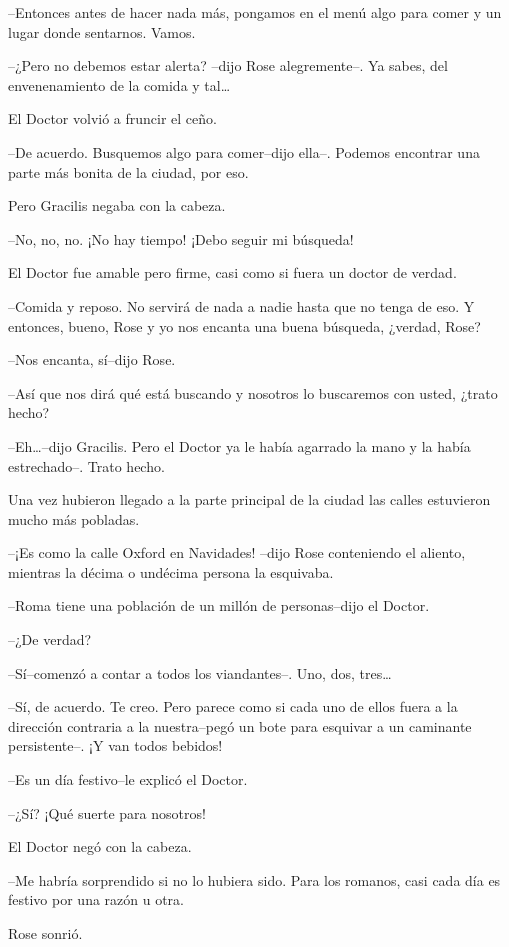 --Entonces antes de hacer nada más, pongamos en el menú algo para comer
y un lugar donde sentarnos. Vamos.

--¿Pero no debemos estar alerta? --dijo Rose alegremente--. Ya sabes,
del envenenamiento de la comida y tal\ldots{}

El Doctor volvió a fruncir el ceño.

--De acuerdo. Busquemos algo para comer--dijo ella--. Podemos encontrar
una parte más bonita de la ciudad, por eso.

Pero Gracilis negaba con la cabeza.

--No, no, no. ¡No hay tiempo! ¡Debo seguir mi búsqueda!

El Doctor fue amable pero firme, casi como si fuera un doctor de verdad.

--Comida y reposo. No servirá de nada a nadie hasta que no tenga de eso.
Y entonces, bueno, Rose y yo nos encanta una buena búsqueda, ¿verdad,
Rose?

--Nos encanta, sí--dijo Rose.

--Así que nos dirá qué está buscando y nosotros lo buscaremos con usted,
¿trato hecho?

--Eh\ldots{}--dijo Gracilis. Pero el Doctor ya le había agarrado la mano
y la había estrechado--. Trato hecho.

Una vez hubieron llegado a la parte principal de la ciudad las calles
estuvieron mucho más pobladas.

--¡Es como la calle Oxford en Navidades! --dijo Rose conteniendo el
aliento, mientras la décima o undécima persona la esquivaba.

--Roma tiene una población de un millón de personas--dijo el Doctor.

--¿De verdad?

--Sí--comenzó a contar a todos los viandantes--. Uno, dos, tres\ldots{}

--Sí, de acuerdo. Te creo. Pero parece como si cada uno de ellos fuera a
la dirección contraria a la nuestra--pegó un bote para esquivar a un
caminante persistente--. ¡Y van todos bebidos!

--Es un día festivo--le explicó el Doctor.

--¿Sí? ¡Qué suerte para nosotros!

El Doctor negó con la cabeza.

--Me habría sorprendido si no lo hubiera sido. Para los romanos, casi
cada día es festivo por una razón u otra.

Rose sonrió.

